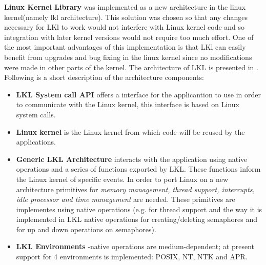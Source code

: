 \textbf{Linux Kernel Library} was implemented as a new architecture in the linux kernel(namely lkl architecture). This solution was chosen so that any changes necessary for LKl to work would not interfere with Linux kernel code and so integration with later kernel versions would not require too much effort. One of the most important advantages of this implementation is that LKl can easily benefit from upgrades and bug fixing in the linux kernel since no modifications were made in other parts of the kernel. 
The architecture of LKL is presented in .
Following is a short description of the architecture components:
\begin{itemize}
\item \textbf{LKL System call API} offers a interface for the applicantion to use in order to communicate with the Linux kernel, this interface is based on Linux system calls.
\item \textbf{Linux kernel} is the Linux kernel from which code will be reused by the applications. 
\item \textbf{Generic LKL Architecture} interacts with the application using native operations and a series of functions exported by LKL. These functions inform the Linux kernel of specific events. In order to port Linux on a new architecture primitives for \textit{memory management, thread support, interrupts, idle processor and time management} are needed. These primitives are implementes using native operations (e.g. for thread support and the way it is implemented in LKL native operations for creating/deleting semaphores and for up and down operations on semaphores). 
\begin{comment}
\begin{itemize}
\item \textit{Memory management mechanism} LKL has implemented a native function for memory allocation.
\item \textit{Thread support} LKL needs an implementation for kernel threads for which purpose native opperation for working with threads are required. These operations will be converted by the lkl architecture in order to work with the linux kernel. Native operations for creating/deleting semaphores and for up and down operations.
\item \textit{Interrupts}
\item \textit{Idle processor}
\item \textit{Time management} 
\end{itemize} 
\end{comment}
\item \textbf{LKL Environments} -native operations are medium-dependent; at present support for 4 environments is implemented:  POSIX, NT, NTK and APR. 
\end{itemize}
